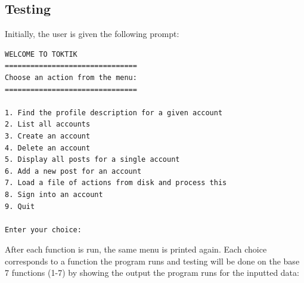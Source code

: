 \documentclass{assignment}
\begin{document}

 \newpage
\subsection{Testing}
Initially, the user is given the following prompt:


\begin{center}
\small {
\color{gray}
\begin{BVerbatim}
WELCOME TO TOKTIK
===============================
Choose an action from the menu:
===============================

1. Find the profile description for a given account
2. List all accounts
3. Create an account
4. Delete an account
5. Display all posts for a single account
6. Add a new post for an account
7. Load a file of actions from disk and process this
8. Sign into an account
9. Quit

Enter your choice:

\end{BVerbatim} 
}
\end{center} \color{black}

\noindent After each function is run, the same menu is printed again. Each choice corresponds to a function the program runs and testing will be done on the base 7 functions (1-7) by showing the output the program runs for the inputted data: \newline
\end{document}

